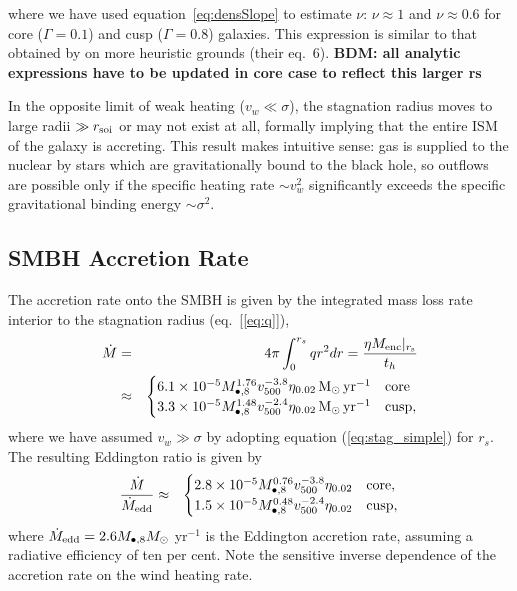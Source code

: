 \documentclass[usenatbib,fleqn]{mn2e}
\newcommand{\Menc}{M_{\rm enc}}
\newcommand{\Mbheight}{M_{\bullet,8}}
\newcommand{\pyear}{{\rm yr}^{-1}}
\renewcommand{\th}{t_h}
\newcommand{\densSlope}{\nu}
\begin{document}
where we have used equation~\eqref{eq:densSlope} to estimate
$\densSlope$: $\densSlope\approx 1$ and $\densSlope \approx 0.6$ for
core ($\Gamma = 0.1$) and cusp ($\Gamma = 0.8$) galaxies.  This
expression is similar to that obtained by \citet{Volonteri+11} on more
heuristic grounds (their eq.~6).  {\bf BDM: all analytic expressions
  have to be updated in core case to reflect this larger rs}

In the opposite limit of weak heating ($v_{w} \ll \sigma$), the
stagnation radius moves to large radii $\gg r_{\rm soi}$ or may not
exist at all, formally implying that the entire ISM of the galaxy is
accreting.  This result makes intuitive sense: gas is supplied to the
nuclear by stars which are gravitationally bound to the black hole, so
outflows are possible only if the specific heating rate $\sim
v_{w}^{2}$ significantly exceeds the specific gravitational binding
energy $\sim \sigma^{2}$.


\subsection{SMBH Accretion Rate}

The accretion rate onto the SMBH is given by the integrated mass loss rate interior to the stagnation radius (eq.~[\ref{eq:q}]), 
\begin{eqnarray}
  \dot{M} &=& 4\pi \int_{0}^{r_{s}}q r^{2}dr = \frac{\eta \Menc|_{r_{\rm s}}}{\th} \nonumber \\
&\approx&
  \begin{cases}
    6.1 \times 10^{-5} M_{\bullet,8}^{1.76}
    v_{500}^{-3.8}  \eta_{0.02} \Msun \, \pyear& \text{core} \\
    3.3 \times 10^{-5} M_{\bullet,8}^{1.48} 
    v_{500}^{-2.4}  \eta_{0.02} \Msun \, \pyear  & \text{cusp}, 
  \end{cases}
  \label{eq:mdot_analytic}
\end{eqnarray}
where we have assumed $v_{w} \gg \sigma$ by adopting equation (\ref{eq:stag_simple}) for $r_s$.  The resulting Eddington ratio is given by 
\begin{eqnarray}
\frac{\dot{M}}{\dot{M}_{\rm edd}} &\approx&
  \begin{cases}
    2.8 \times 10^{-5} M_{\bullet,8}^{0.76}
    v_{500}^{-3.8}  \eta_{0.02}   & \text{core}, \\
    1.5 \times 10^{-5} \Mbheight^{0.48} 
    v_{500}^{-2.4}  \eta_{0.02}   & \text{cusp}, 
  \end{cases}
  \label{eq:eddr_analytic}
\end{eqnarray}
where $\dot{M}_{\rm edd} = 2.6M_{\bullet,8}M_{\odot}$ yr$^{-1}$  is the Eddington accretion rate, assuming a radiative efficiency of ten per cent.  Note the sensitive inverse dependence of the accretion rate on the wind heating rate.  
\end{document}
